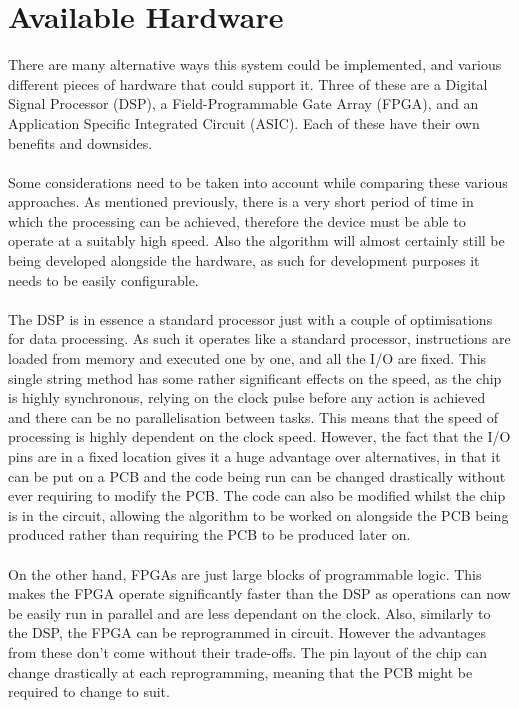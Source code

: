 \section{Available Hardware}
There are many alternative ways this system could be implemented, and various different pieces of hardware that could support it.
Three of these are a Digital Signal Processor (DSP), a Field-Programmable Gate Array (FPGA), and an Application Specific Integrated Circuit (ASIC).
Each of these have their own benefits and downsides.
\\
\\
Some considerations need to be taken into account while comparing these various approaches.
As mentioned previously, there is a very short period of time in which the processing can be achieved, therefore the device must be able to operate at a suitably high speed.
Also the algorithm will almost certainly still be being developed alongside the hardware, as such for development purposes it needs to be easily configurable.
\\
\\
The DSP is in essence a standard processor just with a couple of optimisations for data processing. 
As such it operates like a standard processor, instructions are loaded from memory and executed one by one, and all the I/O are fixed.
This single string method has some rather significant effects on the speed, as the chip is highly synchronous, relying on the clock pulse before any action is achieved and there can be no parallelisation between tasks.
This means that the speed of processing is highly dependent on the clock speed.
However, the fact that the I/O pins are in a fixed location gives it a huge advantage over alternatives, in that it can be put on a PCB and the code being run can be changed drastically without ever requiring to modify the PCB.
The code can also be modified whilst the chip is in the circuit, allowing the algorithm to be worked on alongside the PCB being produced rather than requiring the PCB to be produced later on.
\\
\\
On the other hand, FPGAs are just large blocks of programmable logic.
This makes the FPGA operate significantly faster than the DSP as operations can now be easily run in parallel and are less dependant on the clock.
Also, similarly to the DSP, the FPGA can be reprogrammed in circuit.
However the advantages from these don't come without their trade-offs.
The pin layout of the chip can change drastically at each reprogramming, meaning that the PCB might be required to change to suit.
